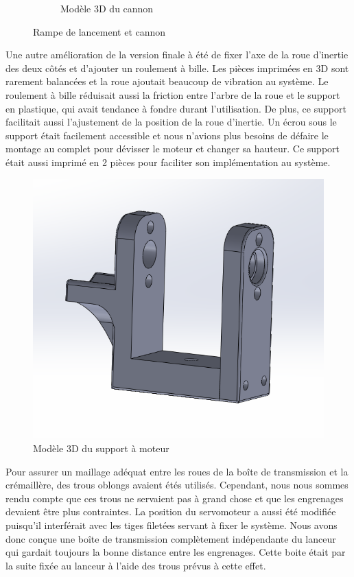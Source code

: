 \begin{figure}[h!]
\begin{subfigure}{0.3\linewidth}
        \caption{Modèle 3D du cannon}
        \label{fig:s2-cad-cannon}
    \end{subfigure}
    \caption{Rampe de lancement et cannon}
    \label{fig:template-example-flottante}
\end{figure}


Une autre amélioration de la version finale à été de fixer l’axe de la roue d’inertie des deux côtés et d’ajouter un roulement à bille.
Les pièces imprimées en 3D sont rarement balancées et la roue ajoutait beaucoup de vibration au système.
Le roulement à bille réduisait aussi la friction entre l’arbre de la roue et le support en plastique, qui avait tendance à fondre durant l’utilisation.
De plus, ce support facilitait aussi l’ajustement de la position de la roue d’inertie.
Un écrou sous le support était facilement accessible et nous n’avions plus besoins de défaire le montage au complet pour dévisser le moteur et changer sa hauteur.
Ce support était aussi imprimé en 2 pièces pour faciliter son implémentation au système.

\begin{figure}[h!]
    \centering
    \includegraphics[width=0.5\linewidth]{img/s2/cad/motorholer}
    \caption{Modèle 3D du support à moteur}
    \label{fig:s2-cad-motorholer}
\end{figure}


Pour assurer un maillage adéquat entre les roues de la boîte de transmission et la crémaillère, des trous oblongs avaient étés utilisés.
Cependant, nous nous sommes rendu compte que ces trous ne servaient pas à grand chose et que les engrenages devaient être plus contraintes.
La position du servomoteur a aussi été modifiée puisqu’il interférait avec les tiges filetées servant à fixer le système.
Nous avons donc conçue une boîte de transmission complètement indépendante du lanceur qui gardait toujours la bonne distance entre les engrenages.
Cette boite était par la suite fixée au lanceur à l’aide des trous prévus à cette effet.

